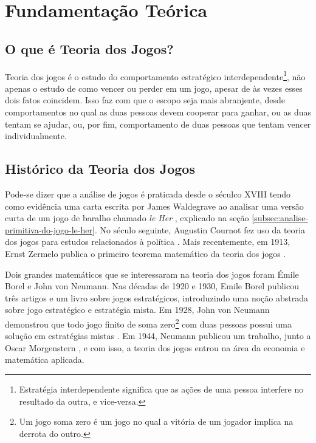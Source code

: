 \chapter[Fundamentação Teórica]{Fundamentação Teórica}
\label{cha:fundamentacao-teorica}

\section{O que é Teoria dos Jogos?}
\label{sec:o-que-e-teoria-dos-jogos}

Teoria dos jogos é o estudo do comportamento estratégico interdependente\footnote{Estratégia interdependente significa que as ações de uma pessoa interfere no resultado da outra, e vice-versa.}\cite{spaniel_2011}, não apenas o estudo de como vencer ou perder em um jogo, apesar de às vezes esses dois fatos coincidem. Isso faz com que o escopo seja mais abranjente, desde comportamentos no qual as duas pessoas devem cooperar para ganhar, ou as duas tentam se ajudar, ou, por fim, comportamento de duas pessoas que tentam vencer individualmente.

\section{Histórico da Teoria dos Jogos}
\label{sec:historico-da-teoria-dos-jogos}

Pode-se dizer que a análise de jogos é praticada desde o séculco XVIII tendo como evidência uma carta escrita por James Waldegrave ao analisar uma versão curta de um jogo de baralho chamado \emph{le Her} \cite{Prague_severalmilestones}, explicado na seção \ref{subsec:analise-primitiva-do-jogo-le-her}. No século seguinte, Augustin Cournot fez uso da teoria dos jogos para estudos relacionados à política \cite{cournot_1838}. Mais recentemente, em 1913, Ernst Zermelo publica o primeiro teorema matemático da teoria dos jogos \cite{zermelo_1913}.

Dois grandes matemáticos que se interessaram na teoria dos jogos foram Émile Borel e John von Neumann. Nas décadas de 1920 e 1930, Emile Borel publicou três artigos \cite{borel_1921} \cite{borel_1924} \cite{borel_1927} e um livro \cite{borel_1938} sobre jogos estratégicos, introduzindo uma noção abstrada sobre jogo estratégico e estratégia mista. Em 1928, John von Neumann demonstrou que todo jogo finito de soma zero\footnote{Um jogo soma zero é um jogo no qual a vitória de um jogador implica na derrota do outro.} com duas pessoas possui uma solução em estratégias mistas \cite{neumann_1928}. Em 1944, Neumann publicou um trabalho, junto a Oscar Morgenstern \cite{neumann_1944}, e com isso, a teoria dos jogos entrou na área da economia e matemática aplicada.


